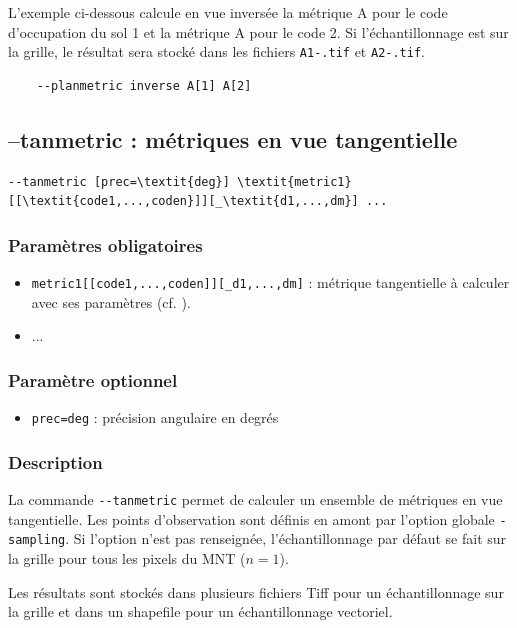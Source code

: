 \documentclass{report}
\begin{document}
L'exemple ci-dessous calcule en vue inversée la métrique A pour le code d'occupation du sol 1 et la métrique A pour le code 2. Si l'échantillonnage est sur la grille, le résultat sera stocké dans les fichiers \verb|A1-.tif| et \verb|A2-.tif|.
\begin{Verbatim}
	--planmetric inverse A[1] A[2]
\end{Verbatim}


\subsection{--tanmetric : métriques en vue tangentielle}
\begin{Verbatim}[commandchars=\\\{\}]
--tanmetric [prec=\textit{deg}] \textit{metric1}[[\textit{code1,...,coden}]][_\textit{d1,...,dm}] ...
\end{Verbatim}

\subsubsection{Paramètres obligatoires}
\begin{itemize}
	\item \verb|metric1[[code1,...,coden]][_d1,...,dm]| : métrique tangentielle à calculer avec ses paramètres (cf. ).
	\item ...
\end{itemize}

\subsubsection{Paramètre optionnel}
\begin{itemize}
	\item \verb|prec=deg| : précision angulaire en degrés
\end{itemize}

\subsubsection{Description}
La commande \verb|--tanmetric| permet de calculer un ensemble de métriques en vue tangentielle. Les points d'observation sont définis en amont par l'option globale \verb|-sampling|. Si l'option n'est pas renseignée, l'échantillonnage par défaut se fait sur la grille pour tous les pixels du MNT ($n=1$).

Les résultats sont stockés dans plusieurs fichiers Tiff pour un échantillonnage sur la grille et dans un shapefile pour un échantillonnage vectoriel.
\end{document}
